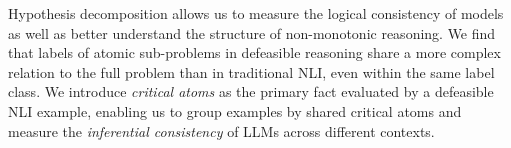 Hypothesis decomposition allows us to measure the logical consistency of models as well as better understand the structure of non-monotonic reasoning.
%
We find that labels of atomic sub-problems in defeasible reasoning share a more complex relation to the full problem than in traditional NLI, even within the same label class.
%
We introduce \textit{critical atoms} as the primary fact evaluated by a defeasible NLI example, enabling us to group examples by shared critical atoms and measure the \textit{inferential consistency} of LLMs across different contexts.